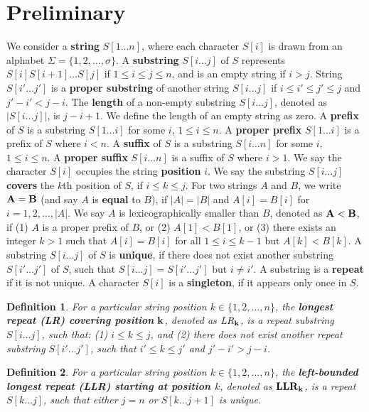\documentclass[preprint]{elsarticle}
\newtheorem{definition}{Definition}[section]
\DeclareMathOperator{\lr}{\mathit{LR}}
\begin{document}
\section{Preliminary}
\label{sec:prelim}
We consider a {\bf string} $S[1\ldots n]$,
where each character $S[i]$ is
drawn from an alphabet $\Sigma=\{1,2,\ldots, \sigma\}$.
A {\bf substring} $S[i\ldots j]$
of $S$ represents $S[i]S[i+1]\ldots S[j]$ if $1\leq i\leq j \leq n$,
and is an empty string if $i>j$.
String $S[i'\ldots j']$ is a {\bf proper substring} of another string
$S[i\ldots j]$ if $i\leq i' \leq j' \leq j$ and $j'-i' < j-i$. 
The {\bf length} of a non-empty substring $S[i\ldots j]$, denoted as
$|S[i\ldots j]|$, is $j-i+1$. We define the length of an empty string
as zero. 
A {\bf prefix} of $S$ is a substring $S[1\ldots i]$
for some $i$, $1\leq i\leq n$. 
A {\bf proper prefix} $S[1\ldots i]$ is a prefix of $S$ where $i <
n$.
A {\bf suffix} of $S$ is a substring
$S[i\ldots n]$ for some $i$, $1\leq i\leq n$.  
A {\bf proper suffix} $S[i\ldots n]$ is a suffix of $S$ where $i >
1$.
We say the character $S[i]$ occupies the string {\bf position} $i$.
We say the substring $S[i\ldots j]$ {\bf covers} the $k$th position of
$S$, if $i\leq k \leq j$.  
For two strings $A$ and $B$, we write ${\bf A=B}$ (and say $A$ is {\bf
  equal} to $B$), if $|A|= |B|$ and $A[i]=B[i]$ for 
$i=1,2,\ldots, |A|$.  
We say $A$ is lexicographically smaller than $B$,
denoted as ${\bf A < B}$, if (1) $A$ is a proper prefix of $B$, or (2)
$A[1] < B[1]$, or (3) there exists an integer $k > 1$ such that
$A[i]=B[i]$ for all $1\leq i \leq k-1$ but $A[k] < B[k]$.
A substring
$S[i\ldots j]$ of $S$ is {\bf unique}, if there does not exist
another substring $S[i'\ldots j']$ of $S$, such that 
$S[i\ldots j] = S[i'\ldots j']$ but $i\neq i'$. 
A substring is a {\bf repeat} if it is not unique.
A character $S[i]$ is a {\bf singleton}, if it appears only once in
$S$.


\begin{definition}
\label{def:lr}
For a particular string position $k\in \{1,2,\ldots, n\}$,  
the {\bf longest repeat (LR) covering position} ${\bf k}$, denoted
as $\mathit{\bf \lr}_{\bf k}$, is 
a repeat substring $S[i\ldots j]$, such that: (1) $i\leq k \leq j$, and 
(2) there does not exist  another repeat substring $S[i'\ldots j']$, such
that $i'\leq k \leq j'$ and $j'-i' > j-i$. 
\end{definition}

\begin{definition}
\label{def:llr}
For a particular string position $k\in \{1,2,\ldots, n\}$, the
{\bf left-bounded longest repeat (LLR) starting at position $k$},
denoted as ${\mathit{\bf LLR}_{\bf k}}$, is a repeat $S[k\ldots j]$,
such that either $j=n$ or $S[k\ldots j+1]$ is unique. 
\end{definition}
\end{document}
